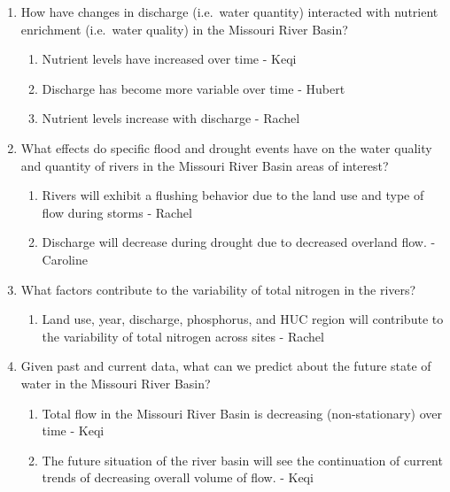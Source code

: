 \documentclass[12pt,]{article}
\providecommand{\tightlist}{%
  \setlength{\itemsep}{0pt}\setlength{\parskip}{0pt}}
\begin{document}
\begin{enumerate}
\def\labelenumi{\arabic{enumi}.}
\item
  How have changes in discharge (i.e.~water quantity) interacted with
  nutrient enrichment (i.e.~water quality) in the Missouri River Basin?

  \begin{enumerate}
  \def\labelenumii{\alph{enumii})}
  \tightlist
  \item
    Nutrient levels have increased over time - Keqi
  \item
    Discharge has become more variable over time - Hubert
  \item
    Nutrient levels increase with discharge - Rachel
  \end{enumerate}
\item
  What effects do specific flood and drought events have on the water
  quality and quantity of rivers in the Missouri River Basin areas of
  interest?

  \begin{enumerate}
  \def\labelenumii{\alph{enumii})}
  \tightlist
  \item
    Rivers will exhibit a flushing behavior due to the land use and type
    of flow during storms - Rachel
  \item
    Discharge will decrease during drought due to decreased overland
    flow. - Caroline
  \end{enumerate}
\item
  What factors contribute to the variability of total nitrogen in the
  rivers?

  \begin{enumerate}
  \def\labelenumii{\alph{enumii})}
  \tightlist
  \item
    Land use, year, discharge, phosphorus, and HUC region will
    contribute to the variability of total nitrogen across sites -
    Rachel
  \end{enumerate}
\item
  Given past and current data, what can we predict about the future
  state of water in the Missouri River Basin?

  \begin{enumerate}
  \def\labelenumii{\alph{enumii})}
  \tightlist
  \item
    Total flow in the Missouri River Basin is decreasing
    (non-stationary) over time - Keqi
  \item
    The future situation of the river basin will see the continuation of
    current trends of decreasing overall volume of flow. - Keqi
  \end{enumerate}
\end{enumerate}
\end{document}
